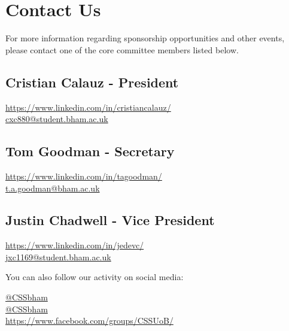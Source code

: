 \documentclass{article}
\begin{document}
\vfill

\fontsize{13}{14}\selectfont

\section*{Contact Us}

For more information regarding sponsorship opportunities and other events, 
please contact one of the core committee members listed below.

\subsection*{Cristian Calauz - President}

\faLinkedin \hspace{0.1cm} \url{https://www.linkedin.com/in/cristiancalauz/} \\
\faEnvelope \hspace{0.1cm} \href{mailto:cxc880@student.bham.ac.uk}{cxc880@student.bham.ac.uk}

\subsection*{Tom Goodman - Secretary}

\faLinkedin \hspace{0.1cm} \url{https://www.linkedin.com/in/tagoodman/} \\
\faEnvelope \hspace{0.1cm} \href{mailto:t.a.goodman@bham.ac.uk}{t.a.goodman@bham.ac.uk}

\subsection*{Justin Chadwell - Vice President}

\faLinkedin \hspace{0.1cm} \url{https://www.linkedin.com/in/jedevc/} \\
\faEnvelope \hspace{0.1cm} \href{mailto:jxc1169@student.bham.ac.uk}{jxc1169@student.bham.ac.uk}

\vspace{1cm}

\noindent You can also follow our activity on social media:
\medskip

\noindent \faTwitter  \hspace{0.1cm} \href{https://twitter.com/cssbham}{@CSSbham} \\
\faInstagram  \hspace{0.1cm} \href{https://www.instagram.com/cssbham/}{@CSSbham} \\
\faFacebook  \hspace{0.3cm} \url{https://www.facebook.com/groups/CSSUoB/}
\end{document}
